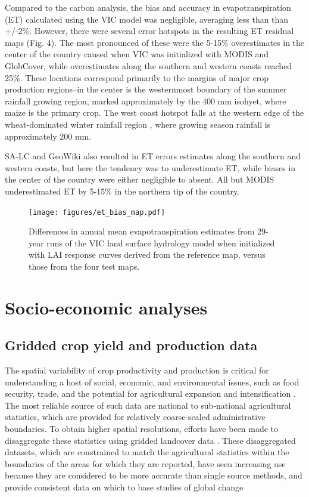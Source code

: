 \documentclass{pnastwo}
\begin{document}
\begin{article}
Compared to the carbon analysis, the bias and accuracy in evapotranspiration (ET) calculated using the VIC model was negligible, averaging less than than +/-2\%. However, there were several error hotspots in the resulting ET residual maps (Fig. 4). The most pronounced of these were the 5-15\% overestimates in the center of the country caused when VIC was initialized with MODIS and GlobCover, while overestimates along the southern and western coasts reached 25\%. These locations correspond primarily to the margins of major crop production regions--in the center is the westernmost boundary of the summer rainfall growing region, marked approximately by the 400 mm isohyet, where maize is the primary crop. The west coast hotspot falls at the western edge of the wheat-dominated winter rainfall region \cite{hardy_rainfed_2011}, where growing season rainfall is approximately 200 mm. 

SA-LC and GeoWiki also resulted in ET errors estimates along the southern and western coasts, but here the tendency was to underestimate ET, while biases in the center of the country were either negligible to absent.  All but MODIS underestimated ET by 5-15\% in the northern tip of the country.  

\begin{figure}[h]
\centerline{\texttt{[image: figures/et\_bias\_map.pdf]}}
\caption{Differences in annual mean evapotranspiration estimates from 29-year runs of the VIC land surface hydrology model when initialized with LAI response curves derived from the reference map, versus those from the four test maps.}\label{afoto}
\end{figure}

\section{Socio-economic analyses}
\subsection{Gridded crop yield and production data}
The spatial variability of crop productivity and production is critical for understanding a host of social, economic, and environmental issues, such as food security, trade, and the potential for agricultural expansion and intensification \cite{licker_mind_2010,monfreda_farming_2008}. The most reliable source of such data are national to sub-national agricultural statistics, which are provided for relatively coarse-scaled administrative boundaries. To obtain higher spatial resolutions, efforts have been made to disaggregate these statistics using gridded landcover data \cite{ramankutty_farming_2008,monfreda_farming_2008}. These disaggregated datasets, which are constrained to match the agricultural statistics within the boundaries of the areas for which they are reported, have seen increasing use because they are considered to be more accurate than single source methods, and provide consistent data on which to base studies of global change \cite{ramankutty_farming_2008, see_improved_2015}


\end{article}
\end{document}

